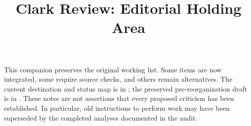\documentclass[12pt]{article}
\title{Clark Review: Editorial Holding Area}
\author{}\date{}
\begin{document}
\maketitle
This companion preserves the original working list. Some items are now
integrated, some require source checks, and others remain alternatives.
The current destination and status map is in
; the preserved pre-reorganization draft
is in .
These notes are not assertions that every proposed criticism has been
established. In particular, old instructions to perform work may have
been superseded by the completed analyses documented in the audit.


\end{document}
